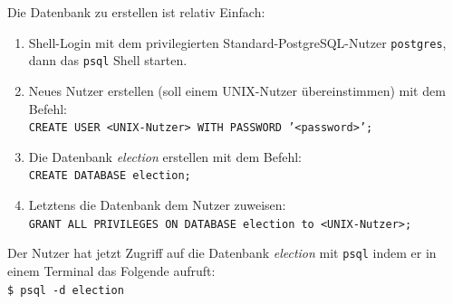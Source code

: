 \documentclass[paper=a4, english, ngerman, romanian]{scrartcl}
\begin{document}
	Die Datenbank zu erstellen ist relativ Einfach:
	\begin{enumerate}
	\item Shell-Login mit dem privilegierten Standard-PostgreSQL-Nutzer \texttt{postgres}, dann das \texttt{psql} Shell starten.
	\item Neues Nutzer erstellen (soll einem UNIX-Nutzer übereinstimmen) mit dem Befehl: \\ 
		\texttt{CREATE USER <UNIX-Nutzer> WITH PASSWORD '<password>';}
	\item Die Datenbank \textit{election} erstellen mit dem Befehl: \\
		\texttt{CREATE DATABASE election;}
	\item Letztens die Datenbank dem Nutzer zuweisen: \\
		\texttt{GRANT ALL PRIVILEGES ON DATABASE election to <UNIX-Nutzer>;}
	\end{enumerate}
	Der Nutzer hat jetzt Zugriff auf die Datenbank \textit{election} mit \texttt{psql} indem er in einem Terminal das Folgende aufruft: \\
	\texttt{\$ psql -d election}
\end{document}
